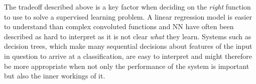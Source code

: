 The tradeoff described above is a key factor when deciding on the \emph{right}
function to use to solve a supervised learning problem. A linear regression
model is easier to understand than complex convoluted functions and \ac {NN}
have often been described as hard to interpret as it is not clear \emph{what}
they learn. Systems such as decision trees, which make many sequential decisions
about features of the input in question to arrive at a classification, are easy
to interpret and might therefore be more appropriate when not only the
performance of the system is important but also the inner workings of it.
